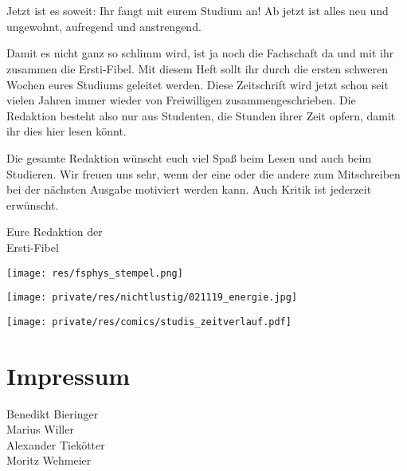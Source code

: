 \section*{\Huge{}}
\begin{multicols*}{2}
Jetzt ist es soweit: Ihr fangt mit eurem Studium an!
Ab jetzt ist alles neu und ungewohnt, aufregend und anstrengend.

Damit es nicht ganz so schlimm wird, ist ja noch die Fachschaft da und mit ihr zusammen die Ersti-Fibel.
Mit diesem Heft sollt ihr durch die ersten schweren Wochen eures Studiums geleitet werden. Diese Zeitschrift wird jetzt schon seit vielen Jahren immer wieder von Freiwilligen zusammengeschrieben.
Die Redaktion besteht also nur aus Studenten, die Stunden ihrer Zeit opfern, damit ihr dies hier lesen könnt.

Die gesamte Redaktion wünscht euch viel Spaß beim Lesen und auch beim Studieren.
Wir freuen uns sehr, wenn der eine oder die andere zum Mitschreiben bei der nächsten Ausgabe motiviert werden kann. Auch Kritik ist jederzeit erwünscht.

Eure Redaktion der\\
Ersti-Fibel

\vspace{-0.75cm}
\hspace{2cm}
\texttt{[image: res/fsphys\_stempel.png]}

\vspace{1.8cm}
\texttt{[image: private/res/nichtlustig/021119\_energie.jpg]}
\vspace{\fill}

\columnbreak

\texttt{[image: private/res/comics/studis\_zeitverlauf.pdf]}

\vspace{-2ex}
\section*{Impressum}
\vspace{-1ex}

{\centering
	\vspace{-1ex}
	\vspace{-1ex}
	Benedikt Bieringer\\
	Marius Willer\\
	Alexander Tiekötter\\
	Moritz Wehmeier
	
}
\end{multicols*}
